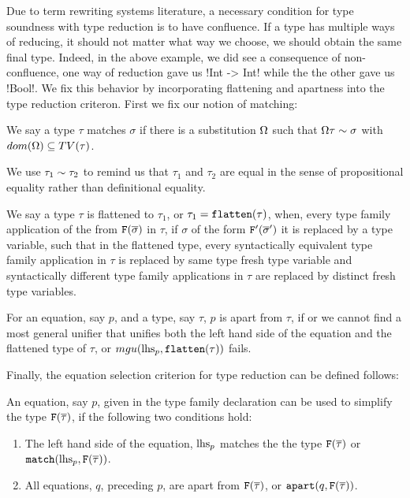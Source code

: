 \documentclass[format=acmsmall,manuscript,review,screen,nonacm,margin=1in,11pt]{acmart}
\begin{document}
Due to term rewriting systems literature\cite{bezem_term_2003}, a necessary condition for type soundness
with type reduction is to have confluence. If a type has multiple ways of reducing,
it should not matter what way we choose, we should obtain the same final type. %
Indeed, in the above example, we did see a consequence of non-confluence, one way of reduction
gave us !Int -> Int! while the the other gave us !Bool!.
We fix this behavior by incorporating flattening and apartness into the type reduction criteron.
First we fix our notion of matching:
\begin{defn}[Matching]\label{def:ctf-match}
  We say a type $\tau$ matches $\sigma$ if there is a substitution $\Omega$ such that $\Omega\tau \mathrel{\sim} \sigma$ with
  $dom(\Omega) \subseteq TV(\tau)$.
\end{defn}
We use $\tau_1 \mathrel{\sim} \tau_2$ to remind us that $\tau_1$ and $\tau_2$ are equal in the sense
of propositional equality rather than definitional equality.
\begin{defn}\label{def:ctf-flatten}
  We say a type $\tau$ is flattened to $\tau_1$, or $\tau_1 = \texttt{flatten}(\tau)$, when, every
  type family application of the from $\texttt{F}(\overline{\sigma})$ in $\tau$,
  if $\sigma$ of the form $\texttt{F}'(\overline{\sigma}')$ it is replaced by a type variable,
  such that in the flattened type, every syntactically equivalent type family application
  in $\tau$ is replaced by same type fresh type variable
  and syntactically different type family applications in $\tau$ are replaced by distinct fresh type variables.
\end{defn}
\begin{defn}[Apartness]\label{def:ctf-apart}
  For an equation, say $p$, and a type, say $\tau$, $p$ is apart from $\tau$, if 
  or we cannot find a most general unifier that unifies both the left hand side of the equation
  and the flattened type of $\tau$, or $mgu(\text{lhs}_{p},\texttt{flatten}(\tau))$ fails.
\end{defn}
Finally, the equation selection criterion for type reduction can be defined follows:
\begin{defn}\label{def:cft-simpl-1}
  An equation, say $p$, given in the type family declaration can be used to simplify the type
  $\texttt{F}(\overline{\tau})$, if the following two conditions hold:
  \begin{enumerate}
  \item The left hand side of the equation, $\text{lhs}_{p}$  matches the the type $\texttt{F}(\overline{\tau})$
    or $\texttt{match}(\text{lhs}_{p}, \texttt{F}(\overline{\tau}))$.
  \item All equations, $q$, preceding $p$, are apart from $\texttt{F}(\overline{\tau})$, or
    $\texttt{apart}(q, \texttt{F}(\overline{\tau}))$.
  \end{enumerate}
\end{defn}
\end{document}
